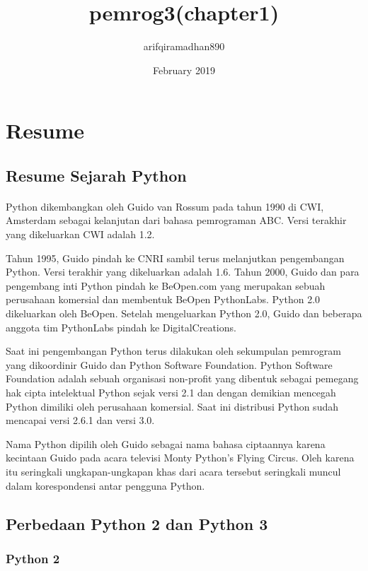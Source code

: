 \documentclass{article}
\title{pemrog3(chapter1)}
\author{arifqiramadhan890 }
\date{February 2019}
\begin{document}
\maketitle



\section{Resume}
\subsection{Resume Sejarah Python}
\paragraph{}
 Python dikembangkan oleh Guido van Rossum pada tahun 1990 di CWI, Amsterdam sebagai kelanjutan dari bahasa pemrograman ABC. Versi terakhir yang dikeluarkan CWI adalah 1.2.

Tahun 1995, Guido pindah ke CNRI sambil terus melanjutkan pengembangan Python. Versi terakhir yang dikeluarkan adalah 1.6. Tahun 2000, Guido dan para pengembang inti Python pindah ke BeOpen.com yang merupakan sebuah perusahaan komersial dan membentuk BeOpen PythonLabs. Python 2.0 dikeluarkan oleh BeOpen. Setelah mengeluarkan Python 2.0, Guido dan beberapa anggota tim PythonLabs pindah ke DigitalCreations.

Saat ini pengembangan Python terus dilakukan oleh sekumpulan pemrogram yang dikoordinir Guido dan Python Software Foundation. Python Software Foundation adalah sebuah organisasi non-profit yang dibentuk sebagai pemegang hak cipta intelektual Python sejak versi 2.1 dan dengan demikian mencegah Python dimiliki oleh perusahaan komersial. Saat ini distribusi Python sudah mencapai versi 2.6.1 dan versi 3.0.

Nama Python dipilih oleh Guido sebagai nama bahasa ciptaannya karena kecintaan Guido pada acara televisi Monty Python's Flying Circus. Oleh karena itu seringkali ungkapan-ungkapan khas dari acara tersebut seringkali muncul dalam korespondensi antar pengguna Python.
\paragraph{}

\subsection{Perbedaan Python 2 dan Python 3}
\subsubsection{Python 2}
\end{document}
